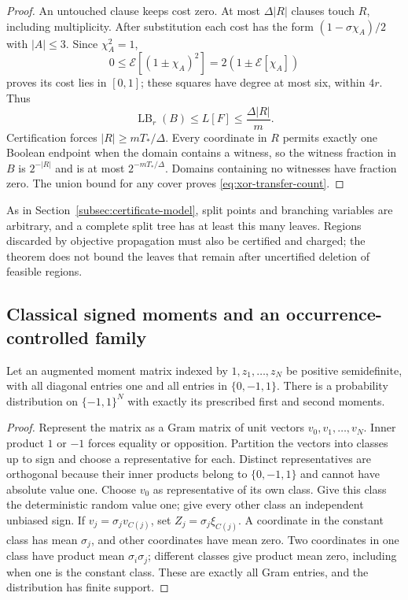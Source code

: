 \begin{proof}
An untouched clause keeps cost zero. At most $\Delta|R|$ clauses touch
$R$, including multiplicity. After substitution each cost has the form
$(1-\sigma\chi_A)/2$ with $|A|\le3$. Since $\chi_A^2=1$,
\[
 0\le\mathcal E[(1\pm\chi_A)^2]
       =2(1\pm\mathcal E[\chi_A])
\]
proves its cost lies in $[0,1]$; these squares have degree at most six,
within $4r$. Thus
\begin{equation}\label{eq:xor-node-cost}
 \operatorname{LB}_r(B)\le L[F]\le\frac{\Delta|R|}{m}.
\end{equation}
Certification forces $|R|\ge mT_*/\Delta$. Every coordinate in $R$
permits exactly one Boolean endpoint when the domain contains a witness,
so the witness fraction in $B$ is $2^{-|R|}$ and is at most
$2^{-mT_*/\Delta}$. Domains containing no witnesses have fraction zero.
The union bound for any cover proves \eqref{eq:xor-transfer-count}.
\end{proof}

As in Section~\ref{subsec:certificate-model}, split points and branching
variables are arbitrary, and a complete split tree has at least this many
leaves. Regions discarded by objective propagation must also be certified
and charged; the theorem does not bound the leaves that remain after
uncertified deletion of feasible regions.

\subsection{Classical signed moments and an occurrence-controlled family}
\begin{lemma}\label{lem:signed-moment-law}
Let an augmented moment matrix indexed by $1,z_1,\ldots,z_N$ be positive
semidefinite, with all diagonal entries one and all entries in
$\{0,-1,1\}$. There is a probability distribution on $\{-1,1\}^N$
with exactly its prescribed first and second moments.
\end{lemma}
\begin{proof}
Represent the matrix as a Gram matrix of unit vectors $v_0,v_1,\ldots,v_N$.
Inner product $1$ or $-1$ forces equality or opposition. Partition the
vectors into classes up to sign and choose a representative for each.
Distinct representatives are orthogonal because their inner products
belong to $\{0,-1,1\}$ and cannot have absolute value one. Choose $v_0$
as representative of its own class. Give this class the deterministic
random value one; give every other class an independent unbiased sign.
If $v_j=\sigma_j v_{C(j)}$, set $Z_j=\sigma_j\xi_{C(j)}$.
A coordinate in the constant class has mean $\sigma_j$, and other
coordinates have mean zero. Two coordinates in one class have product
mean $\sigma_i\sigma_j$; different classes give product mean zero,
including when one is the constant class. These are exactly all Gram
entries, and the distribution has finite support.
\end{proof}


